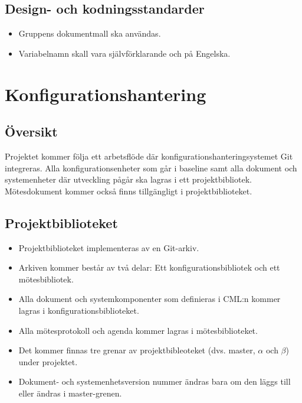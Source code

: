 \documentclass[paper=a4, fontsize=11pt,twoside]{article}
\begin{document}
\subsection*{Design- och kodningsstandarder}
	\begin{itemize}
	\item Gruppens dokumentmall ska användas.
	\item Variabelnamn skall vara självförklarande och på Engelska.
\end{itemize}



\section{Konfigurationshantering}
\subsection*{Översikt}
Projektet kommer följa ett arbetsflöde där konfigurationshanteringsystemet Git
integreras. Alla konfigurationsenheter som går i baseline samt alla dokument och systemenheter där utveckling pågår ska lagras i ett projektbibliotek. Mötesdokument kommer också finns tillgängligt i projektbiblioteket.
 
\subsection*{Projektbiblioteket}
\begin{itemize}
\item Projektbiblioteket implementeras av en Git-arkiv.
\item Arkiven kommer består av två delar: Ett konfigurationsbibliotek och ett mötesbibliotek.
\item Alla dokument och systemkomponenter som definieras i CML:n kommer lagras i konfigurationsbiblioteket.
\item Alla mötesprotokoll och agenda kommer lagras i mötesbiblioteket.
\item Det kommer finnas tre grenar av projektbibleoteket (dvs. master,
  $\alpha$ och $\beta$) under projektet.
\item Dokument- och systemenhetsversion nummer ändras bara om den läggs till
eller ändras i master-grenen.
\end{itemize}
\end{document}
